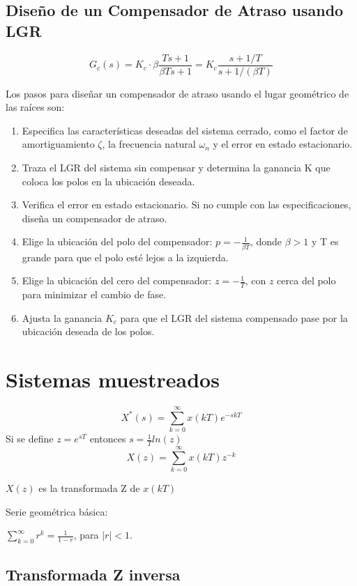 \documentclass[legalpaper,twocolumn]{article}
\begin{document}
\subsection*{Diseño de un Compensador de Atraso usando LGR}

\[
    G_c(s) = K_c \cdot \beta \frac{Ts + 1}{\beta Ts + 1} = K_c \frac{s + 1/T}{s + 1/(\beta T)}
\]

Los pasos para diseñar un compensador de atraso usando el lugar geométrico de las raíces son:

\begin{enumerate}
    \item Especifica las características deseadas del sistema cerrado, como el factor de amortiguamiento \(\zeta\), la frecuencia natural \(\omega_n\) y el error en estado estacionario.
    \item Traza el LGR del sistema sin compensar y determina la ganancia K que coloca los polos en la ubicación deseada.
    \item Verifica el error en estado estacionario. Si no cumple con las especificaciones, diseña un compensador de atraso.
    \item Elige la ubicación del polo del compensador: \( p = -\frac{1}{\beta T} \), donde \(\beta > 1\) y T es grande para que el polo esté lejos a la izquierda.
    \item Elige la ubicación del cero del compensador: \( z = -\frac{1}{T} \), con \( z \) cerca del polo para minimizar el cambio de fase.
    \item Ajusta la ganancia \( K_c \) para que el LGR del sistema compensado pase por la ubicación deseada de los polos.
\end{enumerate}

\section*{Sistemas muestreados}


\[X^*(s) = \sum_{k=0}^{\infty}x(kT)e^{-skT} \]
Si se define $z=e^{sT}$ entonces $s=\frac{1}{T}ln(z)$
\[X(z) = \sum_{k=0}^{\infty}x(kT)z^{-k} \]

$X(z)$ es la transformada Z de $x(kT)$

Serie geométrica básica:
\begin{center}
    \(\sum_{k=0}^\infty r^k= \frac{1}{1- r} \), para $|r| < 1$.
\end{center}



\subsection*{Transformada Z inversa}
\end{document}
